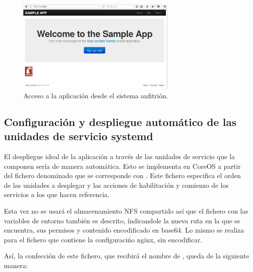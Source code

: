 \begin{figure}[H]
\centering
\includegraphics[width=0.7\textwidth]{images/figures/coreosmanualhost.png}
\caption{Acceso a la aplicación desde el sistema anfitrión.}
\end{figure}

\subsection{Configuración y despliegue automático de las unidades de servicio systemd}

El despliegue ideal de la aplicación a través de las unidades de servicio que la componen sería de manera automática. Esto se implementa en CoreOS a partir del fichero denominado  que se corresponde con . Este fichero especifica el orden de las unidades a desplegar y las acciones de habilitación y comienzo de los servicios a los que hacen referencia.

Esta vez no se usará el almacenamiento NFS compartido así que el fichero con las variables de entorno también es descrito, índicandole la nueva ruta en la que se encuentra, sus permisos y contenido encodificado en base64. Lo mismo se realiza para el fichero que contiene la configuracińo nginx, sin encodificar.

Así, la confección de este fichero, que recibirá el nombre de , queda de la siguiente manera:

